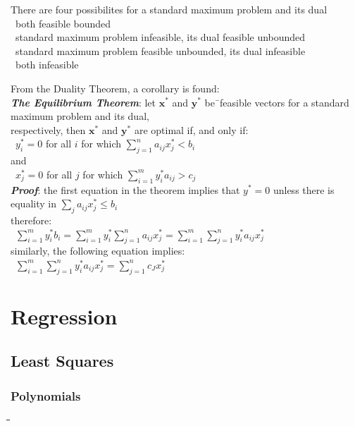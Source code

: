 \documentclass[10pt,letterpaper]{scrartcl}
\newcommand{\boph}[1]{\emph{\textbf{#1}}} %
\newcommand{\tbul}{\textbullet}
\newcommand{\tabDef}{\hspace{2em}\=\hspace{2em}\=\hspace{2em}\=\hspace{2em}\=\kill}
\begin{document}
		There are four possibilites for a standard maximum problem and its dual \\
		\tbul\ both feasible bounded \\
		\tbul\ standard maximum problem infeasible, its dual feasible unbounded \\
		\tbul\ standard maximum problem feasible unbounded, its dual infeasible \\
		\tbul\ both infeasible \\
		\begin{tabbing}
			From the Duality Theorem, a corollary is found: \\
			\boph{The Equilibrium Theorem}: let $\mathbf{x^{*}}$ and $\mathbf{y^{*}}$ be\=\ feasible vectors for a standard maximum problem and its dual, \\ respectively, then $\mathbf{x^{*}}$ and $\mathbf{y^{*}}$ are optimal if, and only if: \\
			\>\ $y^{*}_i = 0$ for all $i$ for which $\displaystyle\sum_{j=1}^{n}a_{ij}x^{*}_j < b_i$ \\
			and \\
			\>\ $x^{*}_j = 0$ for all $j$ for which $\displaystyle\sum_{i=1}^{m}y^{*}_ia_{ij} > c_j$  \\
			\boph{Proof}: the first equation in the theorem implies that $y^{*}=0$ unless there is equality in $\displaystyle\sum_j a_{ij}x^{*}_j\leq b_i$ \\
			therefore: \\
			\>\ $\displaystyle\sum_{i=1}^{m}y^{*}_{i}b_i = \sum_{i=1}^{m}y^{*}_i\sum_{j=1}^{n}a_{ij}x^{*}_j = \sum_{i=1}^{m}\sum_{j=1}^{n}y^{*}_ia_{ij}x^{*}_j$ \\
			similarly, the following equation implies: \\
			\>\ $\displaystyle\sum_{i=1}^m\sum_{j=1}^ny^*_ia_{ij}x^*_j=\sum_{j=1}^nc_Jx^*_j$ \\
		\end{tabbing}
		
		\newpage\section{Regression}
		\subsection{Least Squares}
		\subsubsection*{Polynomials}\begin{tabbing}\tabDef 
		
	\end{tabbing}
\end{document}

